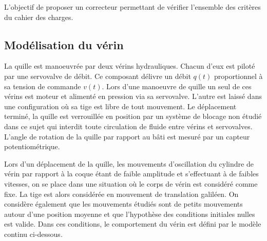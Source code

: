 \begin{multicols}{2}
\begin{obj}
L'objectif de proposer un correcteur permettant de vérifier l'ensemble des critères du cahier des charges. 

\end{obj}
\subsection*{Modélisation du vérin}

\ifprof
\else
La quille est manoeuvrée par deux vérins hydrauliques. Chacun d’eux est piloté par une servovalve de débit. Ce composant délivre un débit $q(t)$ proportionnel à sa tension de commande $v(t)$. Lors d’une manoeuvre de quille un seul de ces vérins est moteur et alimenté en pression via sa servovalve. L’autre est laissé dans une configuration où sa tige est libre de tout mouvement. Le déplacement terminé, la quille est verrouillée en position par un système de blocage non étudié dans ce sujet qui interdit toute circulation de fluide entre vérins et servovalves. L’angle de rotation de la quille par rapport au bâti est mesuré par un capteur potentiométrique.


Lors d’un déplacement de la quille, les mouvements d’oscillation du cylindre de vérin par rapport à la coque étant de faible amplitude et s’effectuant à de faibles vitesses, on se place dans une situation où le corps de vérin est considéré comme fixe. La tige est alors considérée en mouvement de translation galiléen.
On considère également que les mouvements étudiés sont de petits mouvements autour d’une position moyenne et que l’hypothèse des conditions initiales nulles est valide. Dans ces conditions, le comportement du vérin est défini par le modèle continu ci-dessous.

\footnotesize
\begin{center}
\end{center}
\end{multicols}
